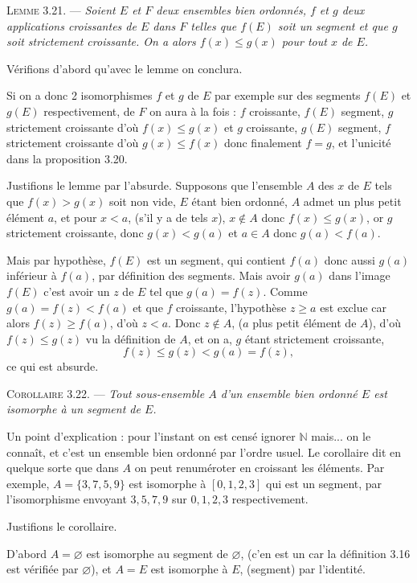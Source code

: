 \medskip\noindent\textsc{Lemme 3.21.} --- \emph{Soient $E$ et $F$ deux ensembles bien ordonnés, $f$ et $g$ deux applications croissantes de $E$ dans $F$ telles que $f(E)$ soit un segment et que $g$ soit strictement croissante. On a alors $f(x)\le g(x)$ pour tout $x$ de $E$.}

Vérifions d'abord qu'avec le lemme on conclura.

Si on a donc 2 isomorphismes $f$ et $g$ de $E$ par exemple sur des segments $f(E)$ et $g(E)$ respectivement, de $F$ on aura à la fois : $f$ croissante, $f(E)$ segment, $g$ strictement croissante d'où $f(x)\le g(x)$ et $g$ croissante, $g(E)$ segment, $f$ strictement croissante d'où $g(x)\le f(x)$ donc finalement $f=g$, et l'unicité dans la proposition 3.20.

Justifions le lemme par l'absurde. Supposons que l'ensemble $A$ des $x$ de $E$ tels que $f(x)>g(x)$ soit non vide, $E$ étant bien ordonné, $A$ admet un plus petit élément $a$, et pour $x<a$, (s'il y a de tels $x$), $x\notin A$ donc $f(x)\le g(x)$, or $g$ strictement croissante, donc $g(x)<g(a)$ et $a\in A$ donc $g(a)<f(a)$.

Mais par hypothèse, $f(E)$ est un segment, qui contient $f(a)$ donc aussi $g(a)$ inférieur à $f(a)$, par définition des segments. Mais avoir $g(a)$ dans l'image $f(E)$ c'est avoir un $z$ de $E$ tel que $g(a)=f(z)$. Comme $g(a)=f(z)<f(a)$ et que $f$ croissante, l'hypothèse $z\ge a$ est exclue car alors $f(z)\ge f(a)$, d'où $z<a$. Donc $z\notin A$, ($a$ plus petit élément de $A$), d'où $f(z)\le g(z)$ vu la définition de $A$, et on a, $g$ étant strictement croissante,
\[
f(z)\le g(z)<g(a)=f(z),
\]
ce qui est absurde. \bookend

\medskip\noindent\textsc{Corollaire 3.22.} --- \emph{Tout sous-ensemble $A$ d'un ensemble bien ordonné $E$ est isomorphe à un segment de $E$.}

Un point d'explication : pour l'instant on est censé ignorer $\mathbb N$ mais... on le connaît, et c'est un ensemble bien ordonné par l'ordre usuel. Le corollaire dit en quelque sorte que dans $A$ on peut renuméroter en croissant les éléments. Par exemple, $A=\{3,7,5,9\}$ est isomorphe à $[0,1,2,3]$ qui est un segment, par l'isomorphisme envoyant $3,5,7,9$ sur $0,1,2,3$ respectivement.

Justifions le corollaire.

D'abord $A=\varnothing$ est isomorphe au segment de $\varnothing$, (c'en est un car la définition 3.16 est vérifiée par $\varnothing$), et $A=E$ est isomorphe à $E$, (segment) par l'identité.

